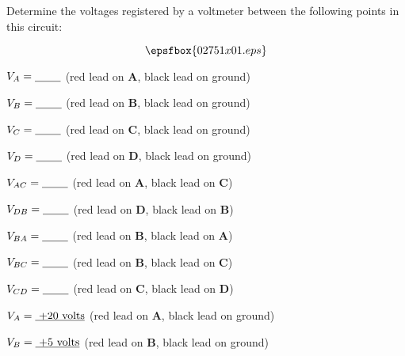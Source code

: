 

Determine the voltages registered by a voltmeter between the following points in this circuit:

$$\epsfbox{02751x01.eps}$$

$V_A = \hbox{\underbar{ \hskip 20pt}}$ (red lead on {\bf A}, black lead on ground)

\vskip 5pt

$V_B = \hbox{\underbar{ \hskip 20pt}}$ (red lead on {\bf B}, black lead on ground)

\vskip 5pt

$V_C = \hbox{\underbar{ \hskip 20pt}}$ (red lead on {\bf C}, black lead on ground)

\vskip 5pt

$V_D = \hbox{\underbar{ \hskip 20pt}}$ (red lead on {\bf D}, black lead on ground)

\vskip 20pt

$V_{AC} = \hbox{\underbar{ \hskip 20pt}}$ (red lead on {\bf A}, black lead on {\bf C})

\vskip 5pt

$V_{DB} = \hbox{\underbar{ \hskip 20pt}}$ (red lead on {\bf D}, black lead on {\bf B})

\vskip 5pt

$V_{BA} = \hbox{\underbar{ \hskip 20pt}}$ (red lead on {\bf B}, black lead on {\bf A})

\vskip 5pt

$V_{BC} = \hbox{\underbar{ \hskip 20pt}}$ (red lead on {\bf B}, black lead on {\bf C})

\vskip 5pt

$V_{CD} = \hbox{\underbar{ \hskip 20pt}}$ (red lead on {\bf C}, black lead on {\bf D})

\vskip 5pt







$V_A = \hbox{\underbar{ +20 volts}}$ (red lead on {\bf A}, black lead on ground)

\vskip 5pt

$V_B = \hbox{\underbar{ +5 volts}}$ (red lead on {\bf B}, black lead on ground)

\vskip 5pt

